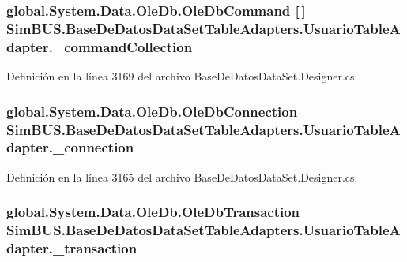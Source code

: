 \subsubsection[{\-\_\-command\-Collection}]{\setlength{\rightskip}{0pt plus 5cm}global.\-System.\-Data.\-Ole\-Db.\-Ole\-Db\-Command [$\,$] Sim\-B\-U\-S.\-Base\-De\-Datos\-Data\-Set\-Table\-Adapters.\-Usuario\-Table\-Adapter.\-\_\-command\-Collection\hspace{0.3cm}{\ttfamily [private]}}\label{class_sim_b_u_s_1_1_base_de_datos_data_set_table_adapters_1_1_usuario_table_adapter_ac5b10aba600a6939421008d41c66a56a}


Definición en la línea 3169 del archivo Base\-De\-Datos\-Data\-Set.\-Designer.\-cs.

\subsubsection[{\-\_\-connection}]{\setlength{\rightskip}{0pt plus 5cm}global.\-System.\-Data.\-Ole\-Db.\-Ole\-Db\-Connection Sim\-B\-U\-S.\-Base\-De\-Datos\-Data\-Set\-Table\-Adapters.\-Usuario\-Table\-Adapter.\-\_\-connection\hspace{0.3cm}{\ttfamily [private]}}\label{class_sim_b_u_s_1_1_base_de_datos_data_set_table_adapters_1_1_usuario_table_adapter_a0fbd3db12fb9b4d75eae0e3d990ce474}


Definición en la línea 3165 del archivo Base\-De\-Datos\-Data\-Set.\-Designer.\-cs.

\subsubsection[{\-\_\-transaction}]{\setlength{\rightskip}{0pt plus 5cm}global.\-System.\-Data.\-Ole\-Db.\-Ole\-Db\-Transaction Sim\-B\-U\-S.\-Base\-De\-Datos\-Data\-Set\-Table\-Adapters.\-Usuario\-Table\-Adapter.\-\_\-transaction\hspace{0.3cm}{\ttfamily [private]}}\label{class_sim_b_u_s_1_1_base_de_datos_data_set_table_adapters_1_1_usuario_table_adapter_a37ac9248ea504f1e2637103c4e614cd6}


